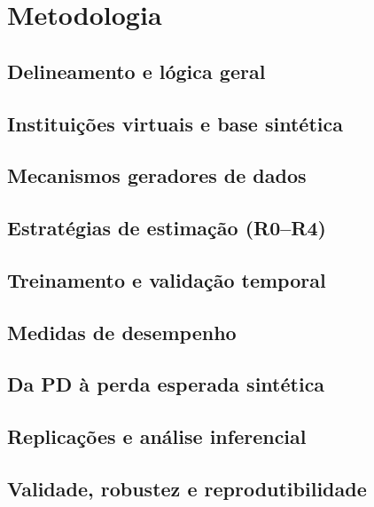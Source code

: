 \section{Metodologia}
\label{cap:metodologia}
\aescrever

\subsection{Delineamento e lógica geral}
\aescrever
\subsection{Instituições virtuais e base sintética}
\aescrever
\subsection{Mecanismos geradores de dados}
\aescrever
\subsection{Estratégias de estimação (R0–R4)}
\aescrever
\subsection{Treinamento e validação temporal}
\aescrever
\subsection{Medidas de desempenho}
\aescrever
\subsection{Da PD à perda esperada sintética}
\aescrever
\subsection{Replicações e análise inferencial}
\aescrever
\subsection{Validade, robustez e reprodutibilidade}
\aescrever
